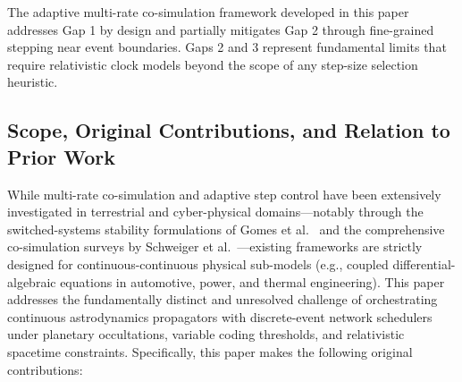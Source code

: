\documentclass[a4paper,fleqn]{cas-sc}
\begin{document}
The adaptive multi-rate co-simulation framework developed in this paper addresses Gap 1 by design and partially mitigates Gap 2 through fine-grained stepping near event boundaries. Gaps 2 and 3 represent fundamental limits that require relativistic clock models beyond the scope of any step-size selection heuristic.

\subsection{Scope, Original Contributions, and Relation to Prior Work}
While multi-rate co-simulation and adaptive step control have been extensively investigated in terrestrial and cyber-physical domains---notably through the switched-systems stability formulations of Gomes et al.~\cite{simpat_adaptive} and the comprehensive co-simulation surveys by Schweiger et al.~\cite{simpat_multirate}---existing frameworks are strictly designed for continuous-continuous physical sub-models (e.g., coupled differential-algebraic equations in automotive, power, and thermal engineering). This paper addresses the fundamentally distinct and unresolved challenge of orchestrating continuous astrodynamics propagators with discrete-event network schedulers under planetary occultations, variable coding thresholds, and relativistic spacetime constraints. Specifically, this paper makes the following original contributions:
\end{document}
